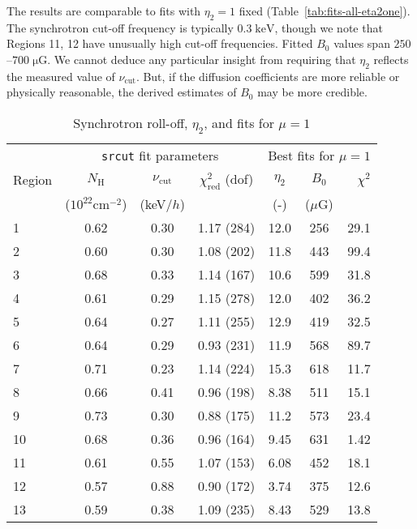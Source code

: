 \documentclass[iop, apj, numberedappendix]{emulateapj}
\newcommand*{\mt}{\mathrm}
\newcommand*{\unit}[1]{\;\mt{#1}}  %
\newcommand*{\muG}{\unit{\mu G}}
\begin{document}
The results are comparable to fits with $\eta_2 = 1$ fixed
(Table~\ref{tab:fits-all-eta2one}).  The synchrotron cut-off frequency is
typically $0.3 \unit{keV}$, though we note that Regions 11, 12 have unusually
high cut-off frequencies.  Fitted $B_0$ values span $250$--$700 \muG$.
We cannot deduce any particular insight from requiring that $\eta_2$ reflects
the measured value of $\nu_{\mt{cut}}$.  But, if the diffusion coefficients are
more reliable or physically reasonable, the derived estimates of $B_0$ may be
more credible.

\begin{table}
    \scriptsize
    \centering
    \caption{Synchrotron roll-off, $\eta_2$, and fits for $\mu = 1$
        \label{tab:fits-srcutlog}}
    \begin{tabular}{@{}l ccc ccr@{}}
    \toprule
    {} & \multicolumn{3}{c}{\texttt{srcut} fit parameters}
       & \multicolumn{3}{c}{Best fits for $\mu = 1$}\\
    \cmidrule(lr){2-4} \cmidrule(l){5-7}
    Region & $N_{\mt{H}}$ & $\nu_{\mt{cut}}$ & $\chi^2_{\mathrm{red}}$ (dof)
           & $\eta_2$ & $B_0$ & $\chi^2$ \\
    {} & ($10^{22} \mt{cm}^{-2}$) & (keV/$h$) & {}
       & (-) & ($\mu$G) & {} \\
    \midrule
     1 & 0.62 & 0.30 & 1.17 (284) & 12.0 & 256 & 29.1 \\
     2 & 0.60 & 0.30 & 1.08 (202) & 11.8 & 443 & 99.4 \\
     3 & 0.68 & 0.33 & 1.14 (167) & 10.6 & 599 & 31.8 \\
    \cmidrule{1-7}
     4 & 0.61 & 0.29 & 1.15 (278) & 12.0 & 402 & 36.2 \\
     5 & 0.64 & 0.27 & 1.11 (255) & 12.9 & 419 & 32.5 \\
     6 & 0.64 & 0.29 & 0.93 (231) & 11.9 & 568 & 89.7 \\
     7 & 0.71 & 0.23 & 1.14 (224) & 15.3 & 618 & 11.7 \\
     8 & 0.66 & 0.41 & 0.96 (198) & 8.38 & 511 & 15.1 \\
     9 & 0.73 & 0.30 & 0.88 (175) & 11.2 & 573 & 23.4 \\
    10 & 0.68 & 0.36 & 0.96 (164) & 9.45 & 631 & 1.42 \\
    \cmidrule{1-7}
    11 & 0.61 & 0.55 & 1.07 (153) & 6.08 & 452 & 18.1 \\
    12 & 0.57 & 0.88 & 0.90 (172) & 3.74 & 375 & 12.6 \\
    13 & 0.59 & 0.38 & 1.09 (235) & 8.43 & 529 & 13.8 \\

\end{tabular}
\end{table}
\end{document}
